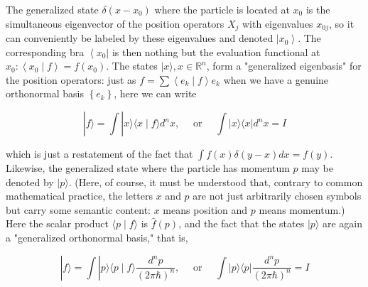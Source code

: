 \documentclass[10pt, letterpaper]{article}
\begin{document}
The generalized state $\delta\left(x-x_{0}\right)$ where the particle is located at $x_{0}$ is the simultaneous eigenvector of the position operators $X_{j}$ with eigenvalues $x_{0 j}$, so it can conveniently be labeled by these eigenvalues and denoted $\left|x_{0}\right\rangle$. The corresponding bra $\left\langle x_{0}\right|$ is then nothing but the evaluation functional at $x_{0}:\left\langle x_{0} \mid f\right\rangle=f\left(x_{0}\right)$. The states $|x\rangle, x \in \mathbb{R}^{n}$, form a "generalized eigenbasis" for the position operators: just as $f=\sum\left\langle e_{k} \mid f\right\rangle e_{k}$ when we have a genuine orthonormal basis $\left\{e_{k}\right\}$, here we can write

$$
|f\rangle=\int|x\rangle\langle x \mid f\rangle d^{n} x, \quad \text { or } \quad \int|x\rangle\langle x| d^{n} x=I
$$

which is just a restatement of the fact that $\int f(x) \delta(y-x) d x=f(y)$. Likewise, the generalized state where the particle has momentum $p$ may be denoted by $|p\rangle$. (Here, of course, it must be understood that, contrary to common mathematical practice, the letters $x$ and $p$ are not just arbitrarily chosen symbols but carry some semantic content: $x$ means position and $p$ means momentum.) Here the scalar product $\langle p \mid f\rangle$ is $\widehat{f}(p)$, and the fact that the states $|p\rangle$ are again a "generalized orthonormal basis," that is,

$$
|f\rangle=\int|p\rangle\langle p \mid f\rangle \frac{d^{n} p}{(2 \pi \hbar)^{n}}, \quad \text { or } \quad \int|p\rangle\langle p| \frac{d^{n} p}{(2 \pi \hbar)^{n}}=I
$$
\end{document}

